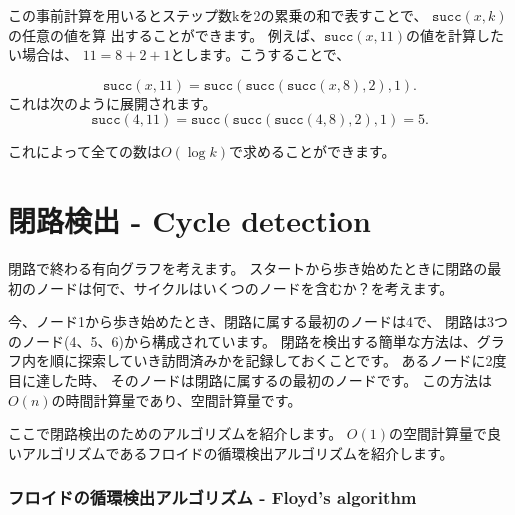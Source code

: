 この事前計算を用いるとステップ数kを2の累乗の和で表すことで、
$\texttt{succ}(x,k)$の任意の値を算 出することができます。
例えば、$\texttt{succ}(x,11)$の値を計算したい場合は、
$11 = 8 + 2 + 1$とします。こうすることで、

\[\texttt{succ}(x,11)=\texttt{succ}(\texttt{succ}(\texttt{succ}(x,8),2),1).\]
これは次のように展開されます。
\[\texttt{succ}(4,11)=\texttt{succ}(\texttt{succ}(\texttt{succ}(4,8),2),1)=5.\]

これによって全ての数は$O(\log k)$で求めることができます。

\section{閉路検出 - Cycle detection}


閉路で終わる有向グラフを考えます。
スタートから歩き始めたときに閉路の最初のノードは何で、サイクルはいくつのノードを含むか？を考えます。

\begin{center}
\end{center}

今、ノード1から歩き始めたとき、閉路に属する最初のノードは4で、
閉路は3つのノード(4、5、6)から構成されています。
閉路を検出する簡単な方法は、グラフ内を順に探索していき訪問済みかを記録しておくことです。
あるノードに2度目に達した時、
そのノードは閉路に属するの最初のノードです。
この方法は$O(n)$の時間計算量であり、空間計算量です。

ここで閉路検出のためのアルゴリズムを紹介します。
$O(1)$の空間計算量で良いアルゴリズムであるフロイドの循環検出アルゴリズムを紹介します。

\subsubsection{フロイドの循環検出アルゴリズム - Floyd's algorithm}

